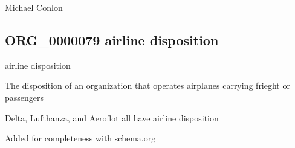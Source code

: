 \documentclass[letterpaper,10pt,english]{sphinxmanual}
\begin{document}
\begin{sphinxShadowBox}

\sphinxAtStartPar
Michael Conlon 
\end{sphinxShadowBox}
\begin{quote}

\ignorespaces \end{quote}


\subsection{ORG\_0000079 \sphinxhyphen{} airline disposition}
\label{\detokenize{doc-ORG_0000079:org-0000079-airline-disposition}}\label{\detokenize{doc-ORG_0000079:index-0}}\label{\detokenize{doc-ORG_0000079::doc}}
\begin{sphinxShadowBox}

\sphinxAtStartPar
airline disposition
\end{sphinxShadowBox}

\begin{sphinxShadowBox}

\sphinxAtStartPar
The disposition of an organization that operates airplanes carrying frieght or passengers
\end{sphinxShadowBox}

\begin{sphinxShadowBox}

\sphinxAtStartPar
{}
\end{sphinxShadowBox}

\begin{sphinxShadowBox}

\sphinxAtStartPar
Delta, Lufthanza, and Aeroflot all have airline disposition
\end{sphinxShadowBox}

\begin{sphinxShadowBox}

\sphinxAtStartPar
Added for completeness with schema.org
\end{sphinxShadowBox}
\end{document}

